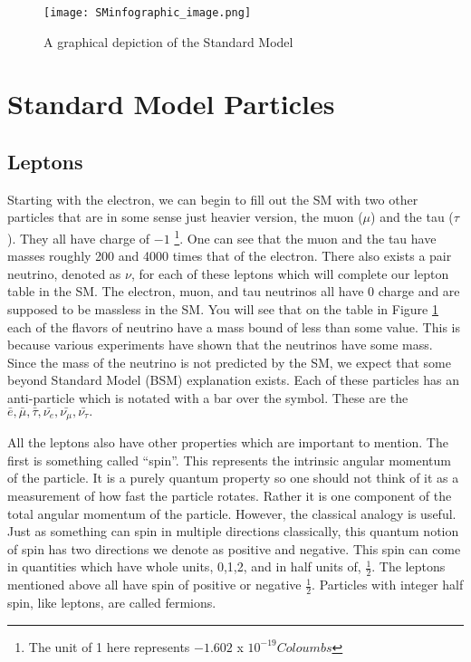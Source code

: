 \begin{figure} %
    \centering
    \texttt{[image: SMinfographic\_image.png]}
    \caption{A graphical depiction of the Standard Model}
    \label{fig:fig_SM}
 \end{figure}
\section{Standard Model Particles}
\subsection{Leptons}
Starting with the electron, we can begin to fill out the SM with two other particles that are in some sense just heavier version, the muon ($\mu$) and the tau ($\tau$). 
They all have charge of $-1$ \footnote{The unit of 1 here represents $-1.602$ x $ 10^{-19} Coloumbs$ }. One can see that the muon and the tau have masses roughly 200 and 4000 times that of the electron.
There also exists a pair neutrino, denoted as $\nu$, for each of these leptons which will complete our lepton table in the SM. The electron, muon, and tau neutrinos all have 0 charge and are supposed to be massless in the SM.
You will see that on the table in Figure \ref{fig:fig_SM} each of the flavors of neutrino have a mass bound of less than some value. This is because various experiments have shown that the neutrinos have some mass.
Since the mass of the neutrino is not predicted by the SM, we expect that some beyond Standard Model (BSM) explanation exists. Each of these particles has an anti-particle which is notated with a bar over the symbol. These are the $\bar{e}, \bar{\mu}, \bar{\tau}, \bar{\nu_{e}}, \bar{\nu_{\mu}}, \bar{\nu_{\tau}}.$

All the leptons also have other properties which are important to mention. The first is something called ``spin''.
This represents the intrinsic angular momentum of the particle. It is a purely quantum property so one should not think of it as a measurement of how fast the particle rotates. 
Rather it is one component of the total angular momentum of the particle. However, the classical analogy is useful. Just as something can spin in multiple directions classically, this quantum notion of spin has two directions we denote as positive and negative.
This spin can come in quantities which have whole units, 0,1,2, and in half units of, $\frac{1}{2}$. The leptons mentioned above all have spin of positive or negative $\frac{1}{2}$.
Particles with integer half spin, like leptons, are called fermions.

